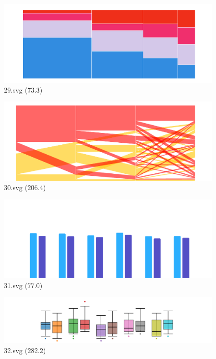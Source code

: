 \documentclass[journal]{IEEEtran}
\begin{document}
\begin{figure}[!htbp]
\centering
\begin{minipage}{0.233\columnwidth}
\centering
\includegraphics[width=\textwidth]{Train_set/29.pdf}
{29.svg (73.3)}
\end{minipage}
\hfill
\begin{minipage}{0.233\columnwidth}
\centering
\includegraphics[width=\textwidth]{Train_set/30.pdf}
{30.svg (206.4)}
\end{minipage}
\hfill
\begin{minipage}{0.233\columnwidth}
\centering
\includegraphics[width=\textwidth]{Train_set/31.pdf}
{31.svg (77.0)}
\end{minipage}
\hfill
\begin{minipage}{0.233\columnwidth}
\centering
\includegraphics[width=\textwidth]{Train_set/32.pdf}
{32.svg (282.2)}
\end{minipage}
\end{figure}
\end{document}
